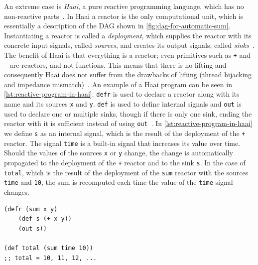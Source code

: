 \documentclass[a4paper]{book}
\begin{document}
An extreme case is \emph{Haai}, a pure reactive programming language, which has
no non-reactive parts~\cite{oeyen2024reactive}. In Haai a reactor is the only
computational unit, which is essentially a description of the DAG shown in
\cref{fig:dag-for-automatic-sum}. Instantiating a reactor is called a
\emph{deployment}, which supplies the reactor with its concrete input signals,
called \emph{sources}, and creates its output signals, called
\emph{sinks}~\cite{oeyen2024reactive}. The benefit of Haai is that everything is
a reactor; even primitives such as \texttt{+} and \texttt{-} are reactors, and
not functions. This means that there is no lifting and consequently Haai does
not suffer from the drawbacks of lifting (thread hijacking and impedance
mismatch)~\cite{oeyen2024reactive}. An example of a Haai program can be seen in
\cref{lst:reactive-program-in-haai}. \texttt{defr} is used to declare a reactor
along with its name and its sources \texttt{x} and \texttt{y}. \texttt{def} is
used to define internal signals and \texttt{out} is used to declare one or
multiple sinks, though if there is only one sink, ending the reactor with it is
sufficient instead of using \texttt{out}~\cite{oeyen2024reactive}. In
\cref{lst:reactive-program-in-haai} we define \texttt{s} as an internal signal,
which is the result of the deployment of the \texttt{+} reactor. The signal
\texttt{time} is a built-in signal that increases its value over time. Should
the values of the sources \texttt{x} or \texttt{y} change, the change is
automatically propagated to the deployment of the \texttt{+} reactor and to the
sink \texttt{s}. In the case of \texttt{total}, which is the result of the
deployment of the \texttt{sum} reactor with the sources \texttt{time} and
\texttt{10}, the sum is recomputed each time the value of the \texttt{time}
signal changes.
\begin{listing}[ht]
	\begin{lstlisting}[language=haai]
(defr (sum x y)
    (def s (+ x y))
    (out s))

(def total (sum time 10))
;; total = 10, 11, 12, ...\end{lstlisting}
	\caption{Reactive program in Haai}
	\label{lst:reactive-program-in-haai}
\end{listing}
\end{document}
